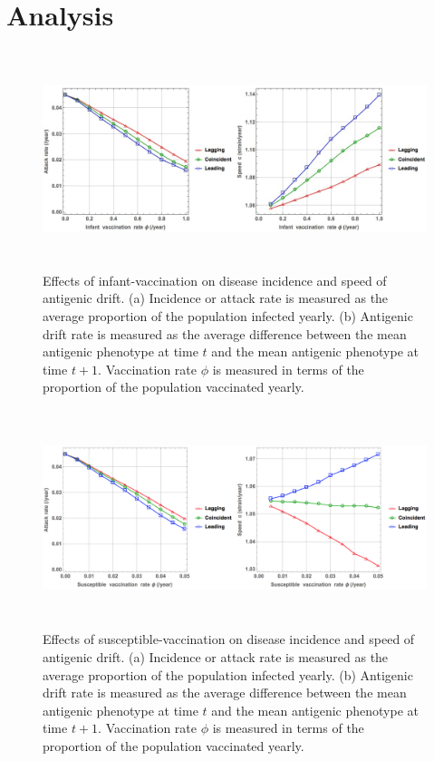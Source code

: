 \documentclass[preprint,12pt]{elsarticle}
\begin{document}
\section{Analysis}
\begin{figure}
  \centering
  \includegraphics[width=6in,height=2.5in]{figures/InfantV}
  \caption{Effects of infant-vaccination on disease incidence and speed of antigenic drift. 
  (a) Incidence or attack rate is measured as the average proportion of the population infected yearly.
  (b) Antigenic drift rate is measured as the average difference between the mean antigenic phenotype at time \(t\) and the mean antigenic phenotype at time \(t+1\).
  Vaccination rate \(\phi\) is measured in terms of the proportion of the population vaccinated yearly.
 }
  \label{fig:InfantV}
\end{figure}


\begin{figure}
  \centering
  \includegraphics[width=6in,height=2.5in]{figures/SusceptibleV}
  \caption{Effects of susceptible-vaccination on disease incidence and speed of antigenic drift. 
  (a) Incidence or attack rate is measured as the average proportion of the population infected yearly.
  (b) Antigenic drift rate is measured as the average difference between the mean antigenic phenotype at time \(t\) and the mean antigenic phenotype at time \(t+1\).
  Vaccination rate \(\phi\) is measured in terms of the proportion of the population vaccinated yearly.
 }
  \label{fig:SusceptibleV}
\end{figure}
\end{document}
